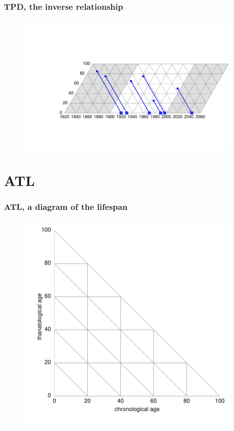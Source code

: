 \documentclass[20pt]{beamer}
\begin{document}
\begin{frame}
\frametitle{TPD, the inverse relationship}
\begin{figure}[b]
    \centering
    \includegraphics{Figures/LabPres/TPD3.pdf}
\end{figure} 
\end{frame}


\section{ATL}
\begin{frame}
\frametitle{ATL, a diagram of the lifespan}
\begin{figure}[b]
    \centering
    \includegraphics{Figures/LabPres/ATL1.pdf}
\end{figure} 
\end{frame}
\end{document}
